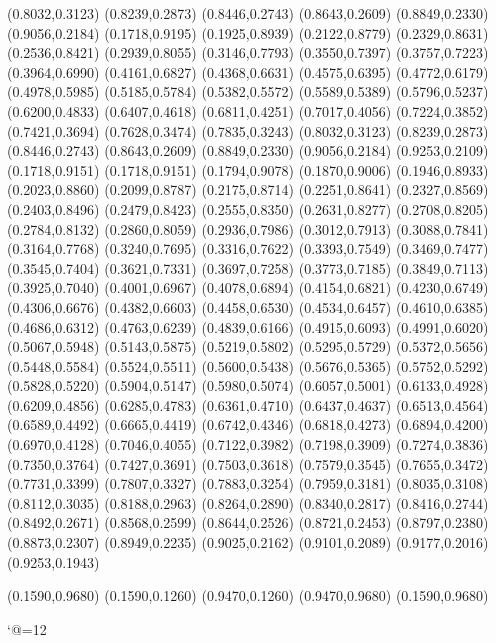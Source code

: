 \PST@Diamond(0.8032,0.3123)
\PST@Diamond(0.8239,0.2873)
\PST@Diamond(0.8446,0.2743)
\PST@Diamond(0.8643,0.2609)
\PST@Diamond(0.8849,0.2330)
\PST@Diamond(0.9056,0.2184)
\PST@Diamond(0.1718,0.9195)
\PST@Diamond(0.1925,0.8939)
\PST@Diamond(0.2122,0.8779)
\PST@Diamond(0.2329,0.8631)
\PST@Diamond(0.2536,0.8421)
\PST@Diamond(0.2939,0.8055)
\PST@Diamond(0.3146,0.7793)
\PST@Diamond(0.3550,0.7397)
\PST@Diamond(0.3757,0.7223)
\PST@Diamond(0.3964,0.6990)
\PST@Diamond(0.4161,0.6827)
\PST@Diamond(0.4368,0.6631)
\PST@Diamond(0.4575,0.6395)
\PST@Diamond(0.4772,0.6179)
\PST@Diamond(0.4978,0.5985)
\PST@Diamond(0.5185,0.5784)
\PST@Diamond(0.5382,0.5572)
\PST@Diamond(0.5589,0.5389)
\PST@Diamond(0.5796,0.5237)
\PST@Diamond(0.6200,0.4833)
\PST@Diamond(0.6407,0.4618)
\PST@Diamond(0.6811,0.4251)
\PST@Diamond(0.7017,0.4056)
\PST@Diamond(0.7224,0.3852)
\PST@Diamond(0.7421,0.3694)
\PST@Diamond(0.7628,0.3474)
\PST@Diamond(0.7835,0.3243)
\PST@Diamond(0.8032,0.3123)
\PST@Diamond(0.8239,0.2873)
\PST@Diamond(0.8446,0.2743)
\PST@Diamond(0.8643,0.2609)
\PST@Diamond(0.8849,0.2330)
\PST@Diamond(0.9056,0.2184)
\PST@Diamond(0.9253,0.2109)
\PST@Dashed(0.1718,0.9151)
(0.1718,0.9151)
(0.1794,0.9078)
(0.1870,0.9006)
(0.1946,0.8933)
(0.2023,0.8860)
(0.2099,0.8787)
(0.2175,0.8714)
(0.2251,0.8641)
(0.2327,0.8569)
(0.2403,0.8496)
(0.2479,0.8423)
(0.2555,0.8350)
(0.2631,0.8277)
(0.2708,0.8205)
(0.2784,0.8132)
(0.2860,0.8059)
(0.2936,0.7986)
(0.3012,0.7913)
(0.3088,0.7841)
(0.3164,0.7768)
(0.3240,0.7695)
(0.3316,0.7622)
(0.3393,0.7549)
(0.3469,0.7477)
(0.3545,0.7404)
(0.3621,0.7331)
(0.3697,0.7258)
(0.3773,0.7185)
(0.3849,0.7113)
(0.3925,0.7040)
(0.4001,0.6967)
(0.4078,0.6894)
(0.4154,0.6821)
(0.4230,0.6749)
(0.4306,0.6676)
(0.4382,0.6603)
(0.4458,0.6530)
(0.4534,0.6457)
(0.4610,0.6385)
(0.4686,0.6312)
(0.4763,0.6239)
(0.4839,0.6166)
(0.4915,0.6093)
(0.4991,0.6020)
(0.5067,0.5948)
(0.5143,0.5875)
(0.5219,0.5802)
(0.5295,0.5729)
(0.5372,0.5656)
(0.5448,0.5584)
(0.5524,0.5511)
(0.5600,0.5438)
(0.5676,0.5365)
(0.5752,0.5292)
(0.5828,0.5220)
(0.5904,0.5147)
(0.5980,0.5074)
(0.6057,0.5001)
(0.6133,0.4928)
(0.6209,0.4856)
(0.6285,0.4783)
(0.6361,0.4710)
(0.6437,0.4637)
(0.6513,0.4564)
(0.6589,0.4492)
(0.6665,0.4419)
(0.6742,0.4346)
(0.6818,0.4273)
(0.6894,0.4200)
(0.6970,0.4128)
(0.7046,0.4055)
(0.7122,0.3982)
(0.7198,0.3909)
(0.7274,0.3836)
(0.7350,0.3764)
(0.7427,0.3691)
(0.7503,0.3618)
(0.7579,0.3545)
(0.7655,0.3472)
(0.7731,0.3399)
(0.7807,0.3327)
(0.7883,0.3254)
(0.7959,0.3181)
(0.8035,0.3108)
(0.8112,0.3035)
(0.8188,0.2963)
(0.8264,0.2890)
(0.8340,0.2817)
(0.8416,0.2744)
(0.8492,0.2671)
(0.8568,0.2599)
(0.8644,0.2526)
(0.8721,0.2453)
(0.8797,0.2380)
(0.8873,0.2307)
(0.8949,0.2235)
(0.9025,0.2162)
(0.9101,0.2089)
(0.9177,0.2016)
(0.9253,0.1943)

\PST@Border(0.1590,0.9680)
(0.1590,0.1260)
(0.9470,0.1260)
(0.9470,0.9680)
(0.1590,0.9680)

\catcode`@=12
\fi
\endpspicture
